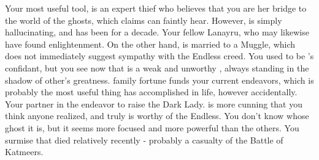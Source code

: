 \documentclass[char]{Katmeers}
\begin{document}
\begin{itemz}[Notes]
	\item 
\end{itemz}

\begin{contacts}
	\contact{\cGinny{}} Your most useful tool, \cGinny{} is an expert thief who believes that you are her bridge to the world of the ghosts, which \cGinny{\they} claims \cGinny{\they} can faintly hear. However, \cGinny{\they} is simply hallucinating, and has been for a decade.
	\contact{\cHermione{}} Your fellow Lanayru, who may likewise have found enlightenment. On the other hand, \cHermione{\they} is married to a Muggle, which does not immediately suggest sympathy with the Endless creed.
	\contact{\cLucius{}} You used to be \cLucius{}'s confidant, but you see now that \cLucius{\they} is a weak and unworthy \cLucius{\human}, always standing in the shadow of other's greatness. \cLucius{\Their} family fortune funds your current endeavors, which is probably the most useful thing \cLucius{} has accomplished in \cLucius{\their} life, however accidentally.
	\contact{\cGoyle{}} Your partner in the endeavor to raise the Dark Lady. \cGoyle{\They} is more cunning that you think anyone realized, and truly is worthy of the Endless.
	 You don't know whose ghost it is, but it seems more focused and more powerful than the others. You surmise that \cGhost{\they} died relatively recently - probably a casualty of the Battle of Katmeers.
\end{contacts}
\end{document}
